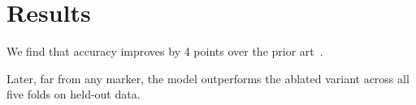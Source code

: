 \section{Results}
We find that accuracy improves by 4 points over the prior art~\citep{lee2023}.

Later, far from any marker, the model outperforms the ablated variant across all five folds on held-out data.
